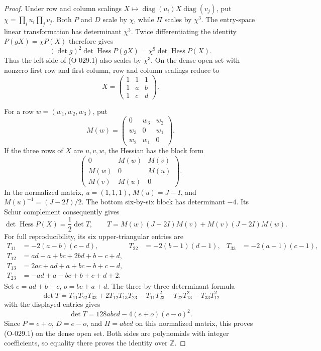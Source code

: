 \begin{proof}
Under row and column scalings
\(X\mapsto\operatorname{diag}(u_i)X\operatorname{diag}(v_j)\),
put \(\chi=\prod_i u_i\prod_j v_j\).
Both \(P\) and \(D\) scale by \(\chi\), while \(\Pi\)
scales by \(\chi^3\).
The entry-space linear transformation has determinant
\(\chi^3\).
Twice differentiating the identity \(P(gX)=\chi P(X)\)
therefore gives
\[
       (\det g)^2\det\operatorname{Hess}P(gX)
                    =\chi^9\det\operatorname{Hess}P(X).
\]
Thus the left side of (O-029.1) also scales by \(\chi^3\).
On the dense open set with nonzero first row and first
column, row and column scalings reduce to
\[
                       X=\begin{pmatrix}
                             1&1&1\\1&a&b\\1&c&d
                          \end{pmatrix}.
\]

For a row \(w=(w_1,w_2,w_3)\), put
\[
 M(w)=\begin{pmatrix}
       0&w_3&w_2\\w_3&0&w_1\\w_2&w_1&0
       \end{pmatrix}.
\]
If the three rows of \(X\) are \(u,v,w\), the Hessian has
the block form
\[
 \begin{pmatrix}
  0&M(w)&M(v)\\
  M(w)&0&M(u)\\
  M(v)&M(u)&0
 \end{pmatrix}.
\]
In the normalized matrix, \(u=(1,1,1)\),
\(M(u)=J-I\), and \(M(u)^{-1}=(J-2I)/2\).
The bottom six-by-six block has determinant \(-4\).
Its Schur complement consequently gives
\[
 \det\operatorname{Hess}P(X)=\frac12\det T,\qquad
 T=M(w)(J-2I)M(v)+M(v)(J-2I)M(w).
\]
For full reproducibility, its six upper-triangular entries are
\[
\begin{aligned}
 T_{11}&=-2(a-b)(c-d),&
 T_{22}&=-2(b-1)(d-1),&
 T_{33}&=-2(a-1)(c-1),\\
 T_{12}&=ad-a+bc+2bd+b-c+d,\\
 T_{13}&=2ac+ad+a+bc-b+c-d,\\
 T_{23}&=-ad+a-bc+b+c+d+2.
\end{aligned}
\]
Set \(e=ad+b+c\), \(o=bc+a+d\).
The three-by-three determinant formula
\[
 \det T=T_{11}T_{22}T_{33}+2T_{12}T_{13}T_{23}
             -T_{11}T_{23}^2-T_{22}T_{13}^2-T_{33}T_{12}^2
\]
with the displayed entries gives
\[
                          \det T=128abcd-4(e+o)(e-o)^2.
\]
Since \(P=e+o\), \(D=e-o\), and \(\Pi=abcd\) on this
normalized matrix, this proves (O-029.1) on the dense open
set. Both sides are polynomials with integer coefficients,
so equality there proves the identity over \(\mathbb Z\).
\end{proof}

